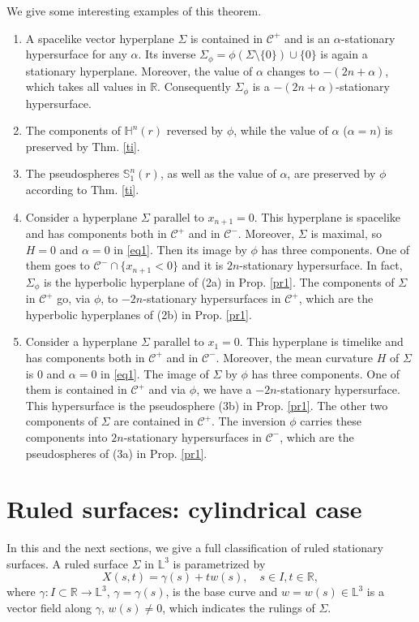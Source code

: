 \documentclass[a4paper,12pt]{amsart}
\theoremstyle{definition}
\def\r{\mathbb R}
\def\h{\mathbb H}
\def\l{\mathbb L}
\begin{document}
We give some interesting examples of this theorem.
\begin{enumerate}
\item  A spacelike vector hyperplane $\Sigma$ is contained in $\mathcal{C}^+$ and is an $\alpha$-stationary hypersurface for any $\alpha$. Its inverse $\Sigma_\phi=\phi(\Sigma\setminus \{0\}) \cup \{0\}$ is again a stationary hyperplane. Moreover, the value of $\alpha$ changes to $-(2n+\alpha)$, which takes all values in $\r$. Consequently $\Sigma_\phi $ is a $-(2n+\alpha)$-stationary hypersurface.
\item The components of  $\h^n(r)$ reversed by $\phi$, while the value of $\alpha $ ($\alpha=n$) is preserved by Thm. \ref{ti}.
\item The pseudospheres $\mathbb{S}^n_1(r)$, as well as the value of $\alpha$, are preserved by $\phi$ according to Thm. \ref{ti}.
\item Consider a hyperplane $\Sigma$ parallel to $x_{n+1}=0$. This hyperplane is spacelike and has components both in $\mathcal{C}^+$ and in $\mathcal{C}^-$. Moreover, $\Sigma$ is maximal, so $H=0$ and $\alpha=0$ in \eqref{eq1}. Then its image by $\phi$ has three components. One of them goes to $\mathcal{C}^-\cap\{x_{n+1}<0\}$ and it is $2n$-stationary hypersurface. In fact, $\Sigma_\phi$ is the hyperbolic hyperplane of (2a) in Prop. \ref{pr1}. The components of $\Sigma$ in $\mathcal{C}^+$ go, via $\phi$, to $-2n$-stationary hypersurfaces in $\mathcal{C}^+$, which are the hyperbolic hyperplanes of (2b) in Prop. \ref{pr1}.
\item Consider a hyperplane $\Sigma$ parallel to $x_1=0$. This hyperplane is timelike and has components both in $\mathcal{C}^+$ and in $\mathcal{C}^-$. Moreover, the mean curvature $H$ of $\Sigma$ is $0$ and $\alpha=0$ in \eqref{eq1}. The  image of $\Sigma$ by $\phi$ has three components. One of them is contained in $\mathcal{C}^+$ and via $\phi$, we have a $-2n$-stationary hypersurface. This hypersurface is the pseudosphere (3b) in Prop. \ref{pr1}. The other two components of $\Sigma$ are contained in  $\mathcal{C}^+$. The inversion $\phi$ carries these components into $2n$-stationary hypersurfaces in $\mathcal{C}^-$, which are the pseudospheres of (3a) in Prop. \ref{pr1}. 
\end{enumerate}
\section{Ruled surfaces: cylindrical case}\label{s3}
In this and the next sections, we give a full classification of ruled stationary surfaces. A ruled surface $\Sigma$ in $\l^3$ is parametrized by  
\begin{equation}
X(s,t)=\gamma(s)+tw(s), \quad s\in I, t\in \r,\label{rp}
\end{equation}
where  $\gamma:I\subset \r \to \l^3$, $\gamma=\gamma(s)$, is the base curve  and   $w=w(s)\in\l^3$ is a vector field  along $\gamma$, $w(s)\not=0$, which indicates the rulings of $\Sigma$.  
\end{document}
